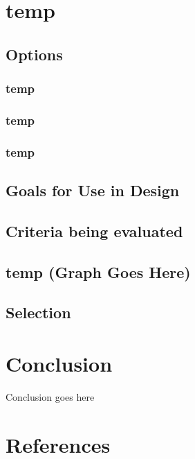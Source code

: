 \documentclass[10pt,letterpaper,onecolumn,journal]{IEEEtran}
\begin{document}
\section{temp}

\subsection{Options}
\subsubsection{temp}

\subsubsection{temp}

\subsubsection{temp}

\subsection{Goals for Use in Design}

\subsection{Criteria being evaluated}

\subsection*{temp (Graph Goes Here)}

\subsection{Selection}

\section{Conclusion}

Conclusion goes here

\section{References}



\end{document}
